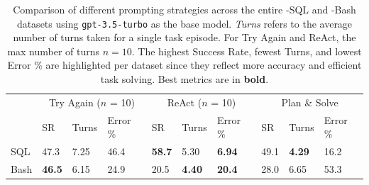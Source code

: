 \begin{table}
\centering
\begin{tabular}{llll|lll|lll}
\toprule
     & \multicolumn{3}{c}{Try Again ($n$ = 10)} & \multicolumn{3}{c}{ReAct ($n$ = 10)} & \multicolumn{3}{c}{Plan \& Solve} \\
     & SR & Turns & Error \%
     & SR & Turns & Error \%
     & SR & Turns & Error \% \\
\midrule
SQL & 47.3 & 7.25 & 46.4
    & \textbf{58.7} & 5.30 & \textbf{6.94}
    & 49.1 & \textbf{4.29} & 16.2 \\
Bash & \textbf{46.5} & 6.15 & 24.9
    & 20.5 & \textbf{4.40} & \textbf{20.4}
    & 28.0 & 6.65 & 53.3 \\
\bottomrule
\end{tabular}
\vspace{5pt}
\caption{Comparison of different prompting strategies across the entire \benchmark{}-SQL and \benchmark{}-Bash datasets using \texttt{gpt-3.5-turbo} as the base model. \textit{Turns} refers to the average number of turns taken for a single task episode. For Try Again and ReAct, the max number of turns $n = 10$. The highest Success Rate, fewest Turns, and lowest Error \% are highlighted per dataset since they reflect more accuracy and efficient task solving. Best metrics are in \textbf{bold}.}
\label{table:strategy-comparison}
\vspace{-1.5em}
\end{table}